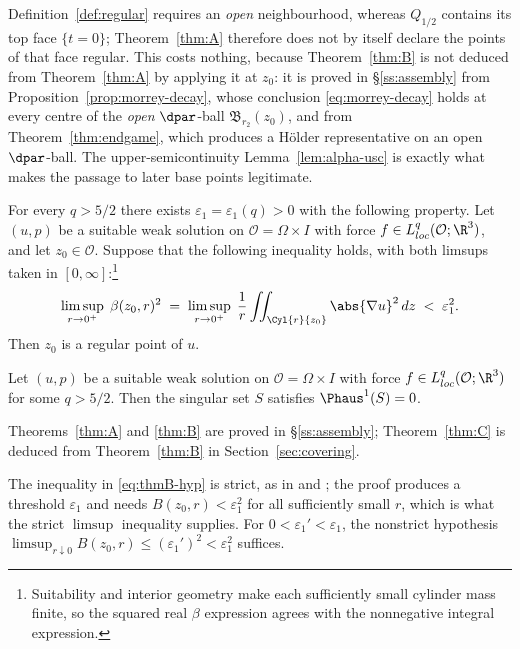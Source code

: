 \documentclass[11pt,reqno]{amsart}
\begin{document}
\begin{remark}\label{rem:top-face}
Definition~\ref{def:regular} requires an \emph{open} neighbourhood, whereas
$Q_{1/2}$ contains its top face $\{t=0\}$; Theorem~\ref{thm:A} therefore does
not by itself declare the points of that face regular. This costs nothing,
because Theorem~\ref{thm:B} is not deduced from Theorem~\ref{thm:A} by applying
it at $z_{0}$: it is proved in \S\ref{ss:assembly} from
Proposition~\ref{prop:morrey-decay}, whose conclusion
\eqref{eq:morrey-decay} holds at every centre of the \emph{open}
$\dpar$-ball $\mathfrak{B}_{r_{2}}(z_{0})$, and from
Theorem~\ref{thm:endgame}, which produces a H\"older representative on an open
$\dpar$-ball. The upper-semicontinuity Lemma~\ref{lem:alpha-usc} is exactly what
makes the passage to later base points legitimate.
\end{remark}

\begin{theorem}\label{thm:B}
For every $q>5/2$ there exists $\varepsilon_{1}=\varepsilon_{1}(q)>0$ with the
following property. Let $(u,p)$ be a suitable weak solution on
$\mathcal{O}=\Omega\times I$ with force $f\in L^{q}_{loc}(\mathcal{O};\R^{3})$,
and let $z_{0}\in\mathcal{O}$. Suppose that the following inequality holds,
with both limsups taken in $[0,\infty]$:\footnote{Suitability and interior
geometry make each sufficiently small cylinder mass finite, so the squared
real $\beta$ expression agrees with the nonnegative integral expression.}
\begin{equation}\label{eq:thmB-hyp}
  \limsup_{r\to0^{+}}\;\beta(z_{0},r)^{2}
  \;=\;\limsup_{r\to0^{+}}\;\frac1r\iint_{\Cyl{r}{z_{0}}}\abs{\nabla u}^{2}\,dz
  \;<\;\varepsilon_{1}^{2}.
\end{equation}
Then $z_{0}$ is a regular point of $u$.
\end{theorem}

\begin{theorem}\label{thm:C}
Let $(u,p)$ be a suitable weak solution on $\mathcal{O}=\Omega\times I$ with
force $f\in L^{q}_{loc}(\mathcal{O};\R^{3})$ for some $q>5/2$. Then the singular
set $S$ satisfies $\Phaus^{1}(S)=0$.
\end{theorem}

Theorems~\ref{thm:A} and \ref{thm:B} are proved in \S\ref{ss:assembly};
Theorem~\ref{thm:C} is deduced from Theorem~\ref{thm:B} in
Section~\ref{sec:covering}.

\begin{remark}\label{rem:strict}
The inequality in \eqref{eq:thmB-hyp} is strict, as in
\cite[Theorem 2.2]{LadyzhenskayaSeregin1999} and
\cite[Theorem 1]{Kukavica2008}; the proof produces a threshold
$\varepsilon_{1}$ and needs $B(z_{0},r)<\varepsilon_{1}^{2}$ for all sufficiently
small $r$, which is what the strict $\limsup$ inequality supplies. For
$0<\varepsilon_{1}'<\varepsilon_{1}$, the nonstrict hypothesis
$\limsup_{r\downarrow0}B(z_{0},r)\le(\varepsilon_{1}')^{2}<\varepsilon_{1}^{2}$ suffices.
\end{remark}
\end{document}
